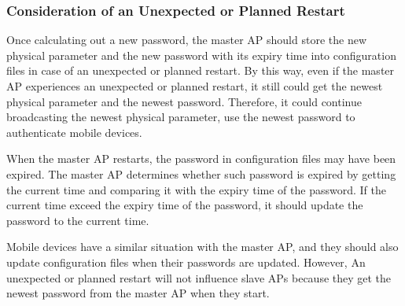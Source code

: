 \subsubsection{Consideration of an Unexpected or Planned Restart}
Once calculating out a new password, the master AP should store the new physical parameter and the new password with its expiry time into configuration files in case of an unexpected or planned restart. By this way, even if the master AP experiences an unexpected or planned restart, it still could get the newest physical parameter and the newest password. Therefore, it could continue broadcasting the newest physical parameter, use the newest password to authenticate mobile devices.


When the master AP restarts, the password in configuration files may have been expired. The master AP determines whether such password is expired by getting the current time and comparing it with the expiry time of the password. If the current time exceed the expiry time of the password, it should update the password to the current time. 


Mobile devices have a similar situation with the master AP, and they should also update configuration files when their passwords are updated. However, An unexpected or planned restart will not influence slave APs because they get the newest password from the master AP when they start. 

